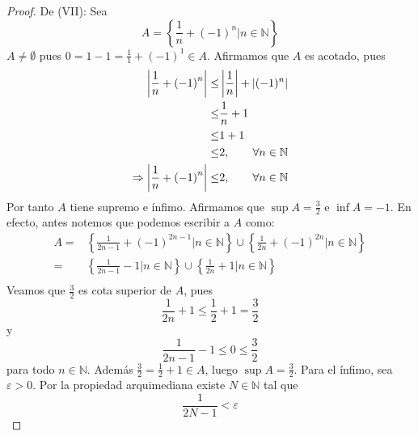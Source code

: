 \documentclass[12pt]{article}
\begin{document}
\begin{enumerate}
\begin{proof}
        De (VII): Sea
        \begin{equation*}
            A = \left\{\frac{1}{n}+\left(-1\right)^n|n\in\mathbb{N}\right\}
        \end{equation*}
        $A\neq \emptyset$ pues $0=1-1=\frac{1}{1}+(-1)^1\in A$. Afirmamos que $A$ es acotado, pues
        \begin{equation*}
            \begin{split}
                \left| \frac{1}{n}+\left(-1\right)^n \right|\leq &\left| \frac{1}{n} \right|+\left| (-1)^n \right|\\
                \leq &\frac{1}{n}+1\\
                \leq &1+1\\
                \leq &2, \qquad\forall n\in\mathbb{N}\\
                \Rightarrow \left| \frac{1}{n}+\left(-1\right)^n \right|\leq &2, \qquad\forall n\in\mathbb{N}\\
            \end{split}
        \end{equation*}
        Por tanto $A$ tiene supremo e ínfimo. Afirmamos que $\sup A = \frac{3}{2}$ e $\inf A = -1$. En efecto, antes notemos que podemos escribir a $A$ como:
        \begin{equation*}
            \begin{split}
                A =& \left\{\frac{1}{2n-1}+(-1)^{2n-1}|n\in\mathbb{N}\right\}\cup\left\{\frac{1}{2n}+(-1)^{2n}|n\in\mathbb{N}\right\}\\
                =& \left\{\frac{1}{2n-1}-1|n\in\mathbb{N}\right\}\cup\left\{\frac{1}{2n}+1|n\in\mathbb{N}\right\}\\
            \end{split}
        \end{equation*}
        Veamos que $\frac{3}{2}$ es cota superior de $A$, pues
        \begin{equation*}
            \frac{1}{2n}+1\leq \frac{1}{2}+1=\frac{3}{2}
        \end{equation*}
        y
        \begin{equation*}
            \frac{1}{2n-1}-1\leq 0\leq\frac{3}{2}
        \end{equation*}
        para todo $n\in\mathbb{N}$. Además $\frac{3}{2}=\frac{1}{2}+1\in A$, luego $\sup A = \frac{3}{2}$.
        Para el ínfimo, sea $\varepsilon > 0$. Por la propiedad arquimediana existe $N\in\mathbb{N}$ tal que
        \begin{equation*}
            \frac{1}{2N-1}<\varepsilon

\end{equation*}
\end{proof}
\end{enumerate}
\end{document}
